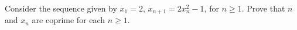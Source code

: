 Consider the sequence given by $x_1 = 2$, $x_{n+1} = 2x_n^2-1$, for $n \ge 1$. Prove that $n$ and $x_n$ are coprime for each $n \ge 1$.

